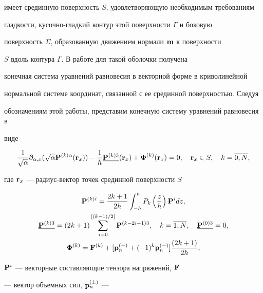 имеет срединную поверхность $S$, удовлетворяющую необходимым требованиям 


гладкости, кусочно-гладкий контур этой поверхности $\Gamma$ и боковую 


поверхность $\Sigma$, образованную движением нормали $\bold m$ к поверхности 


$S$ вдоль контура $\Gamma$. В работе \cite{Vek} для такой оболочки получена 


конечная система уравнений равновесия в векторной форме в криволинейной 


нормальной системе координат, связанной с ее срединной поверхностью. Следуя 


обозначениям этой работы, представим конечную систему уравнений равновесия в 


виде 


\begin{equation} 


\frac{1}{\sqrt \alpha}


\partial_{\alpha,x}(\sqrt\alpha {\bold P}^{(k)\alpha}({\bold r}_x)) 


-\frac{1}{h}\underline{{\bold P}^{(k)3}}({\bold r}_x)+{\boldsymbol \Phi}^{(k)} 


({\bold r}_x) = 0,\quad {\bold r}_x\in S,\quad k=\overline{0,N}, 


\end{equation} 


где ${\bold r}_x$ --- радиус-вектор точек срединной поверхности $S$ 


\begin{gather*} 


{\bold P}^{(k)i}=\frac{2k+1}{2h}\int^h_{-h}P_k\left(\frac{z}{h}\right) 


{\bold P}^i dz,\\ 


\underline{{\bold P}^{(k)3}}=(2k+1)\sum^{[(k-1)/2]}_{i=0}{\bold P}^{(k-2i-1)3}, 


\quad k=\overline{1,N}, \quad \underline{{\bold P}^{(0)3}}=0,\\ 


{\boldsymbol \Phi^{(k)}}={\bold F}^{(k)}+[{\bold p}^{(+)}_n+(-1)^k 


{\bold p}^{(-)}_n]\frac{(2k+1)}{2h}, 


\end{gather*} 


${\bold P}^i$ --- векторные составляющие тензора напряжений, ${\bold F}$ 


--- вектор объемных сил, ${\bold p}^{(\pm)}_n$ --- 


